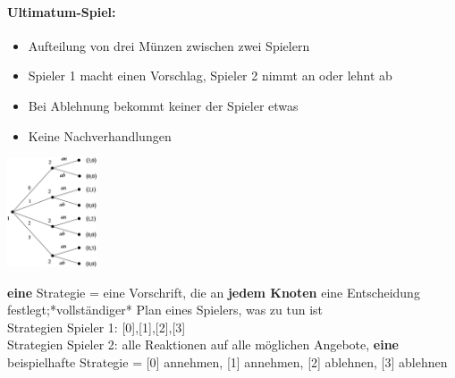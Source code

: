 \documentclass[11pt]{article}
\begin{document}
\paragraph{Ultimatum-Spiel:}
\begin{itemize}
\item Aufteilung von drei Münzen zwischen zwei Spielern
\item Spieler 1 macht einen Vorschlag, Spieler 2 nimmt an oder lehnt ab
\item Bei Ablehnung bekommt keiner der Spieler etwas
\item Keine Nachverhandlungen
\end{itemize}
\begin{center}
\includegraphics[width=100px]{./urbaum.png}
\end{center}

\textbf{eine} Strategie = eine Vorschrift, die an \textbf{jedem Knoten} eine Entscheidung festlegt;*vollständiger* Plan eines Spielers, was zu tun ist\\
Strategien Spieler 1: [0],[1],[2],[3]\\
Strategien Spieler 2: alle Reaktionen auf alle möglichen Angebote, \textbf{eine} beispielhafte Strategie = [0] annehmen, [1] annehmen, [2] ablehnen, [3] ablehnen
\end{document}
